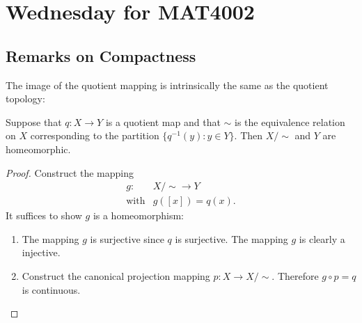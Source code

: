\section{Wednesday for MAT4002}
\subsection{Remarks on Compactness}








The image of the quotient mapping is intrinsically the same as the quotient topology:
\begin{proposition}
Suppose that $q:X\to Y$ is a quotient map and that $\sim$ is the equivalence relation on $X$ corresponding to the partition $\{q^{-1}(y):y\in Y\}$.
Then $X/\sim$ and $Y$ are homeomorphic.
\end{proposition}
\begin{proof}
Construct the mapping
\[
\begin{array}{ll}
g:&X/\sim\to Y\\
\text{with}&g([x]) = q(x).
\end{array}
\]
It suffices to show $g$ is a homeomorphism:
\begin{enumerate}
\item
The mapping $g$ is surjective since $q$ is surjective.
The mapping $g$ is clearly a injective.
\item
Construct the canonical projection mapping $p:X\to X/\sim$.
Therefore $g\circ p = q$ is continuous.


\end{enumerate}
\end{proof}